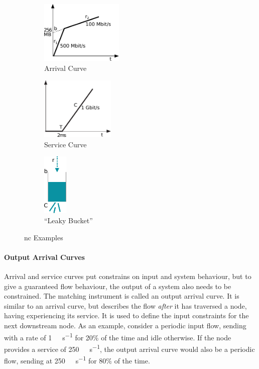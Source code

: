 \begin{figure}[H]
        \centering
        \begin{subfigure}[b]{0.3\textwidth}
            \centering
            \includegraphics*[width=\linewidth,height=3cm,keepaspectratio]{Figures/nc_core_examples_a}
            \caption{Arrival Curve}\label{fig:ex_arr}
        \end{subfigure}
        \begin{subfigure}[b]{0.3\textwidth}
            \centering
            \includegraphics*[width=\linewidth,height=3cm,keepaspectratio]{Figures/nc_core_examples_b}
            \caption{Service Curve}\label{fig:ex_serv}
        \end{subfigure}
        \begin{subfigure}[b]{0.3\textwidth}
            \centering
              \includegraphics*[width=\linewidth,height=3cm,keepaspectratio]{Figures/nc_core_examples_c}
            \caption{\enquote{Leaky Bucket}}\label{fig:ex_leaky}
        \end{subfigure}
        \caption{\gls{nc} Examples}\label{fig:ex}
\end{figure}
%
\paragraph{Output Arrival Curves}
Arrival and service curves put constrains on input and system behaviour, but to give a guaranteed flow behaviour, the output of a system also needs to be constrained.
The matching instrument is called an output arrival curve. It is similar to an arrival curve, but describes the flow \emph{after} it has traversed a node, having experiencing its service.
It is used to define the input constraints for the next downstream node.
As an example, consider a periodic input flow, sending with a rate of \SI{1}{\giga\bit\per\second} for 20\% of the time and idle otherwise. 
If the node provides a service of \SI{250}{\mega\bit\per\second}, the output arrival curve would also be a periodic flow, sending at \SI{250}{\mega\bit\per\second} for 80\% of the time.
